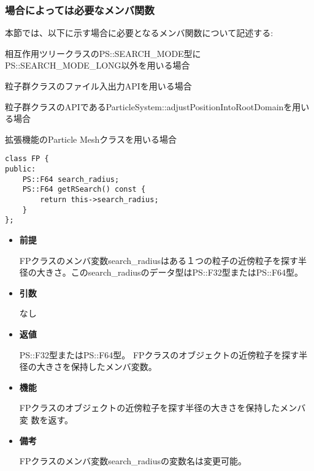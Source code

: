 \subsubsection{場合によっては必要なメンバ関数}


本節では、以下に示す場合に必要となるメンバ関数について記述する:
\begin{enumerate}[leftmargin=*,itemsep=-1ex,label={[\arabic*]}]
\item 相互作用ツリークラスのPS::SEARCH\_MODE型にPS::SEARCH\_MODE\_LONG以外を用いる場合
\item 粒子群クラスのファイル入出力APIを用いる場合
\item 粒子群クラスのAPIであるParticleSystem::adjustPositionIntoRootDomainを用いる場合
\item 拡張機能のParticle Meshクラスを用いる場合
\end{enumerate}



\begin{screen}
\begin{verbatim}
class FP {
public:
    PS::F64 search_radius;
    PS::F64 getRSearch() const {
        return this->search_radius;
    }
};
\end{verbatim}
\end{screen}

\begin{itemize}

\item {\bf 前提}

  FPクラスのメンバ変数search\_radiusはある１つの粒子の近傍粒子を探す半
  径の大きさ。このsearch\_radiusのデータ型はPS::F32型またはPS::F64型。
  
\item {\bf 引数}

  なし
  
\item {\bf 返値}

  PS::F32型またはPS::F64型。 FPクラスのオブジェクトの近傍粒子を探す半
  径の大きさを保持したメンバ変数。
  
\item {\bf 機能}

  FPクラスのオブジェクトの近傍粒子を探す半径の大きさを保持したメンバ変
  数を返す。

\item {\bf 備考}

  FPクラスのメンバ変数search\_radiusの変数名は変更可能。
  
\end{itemize}
\fi

